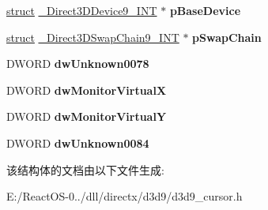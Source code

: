 \begin{DoxyCompactItemize}
\item 
\mbox{\label{struct___d3_d9_cursor_aa865b6a8f684fdb652df907484477e27}} 
\hyperlink{interfacestruct}{struct} \hyperlink{struct___direct3_d_device9___i_n_t}{\+\_\+\+Direct3\+D\+Device9\+\_\+\+I\+NT} $\ast$ {\bfseries p\+Base\+Device}
\item 
\mbox{\label{struct___d3_d9_cursor_ac754d85b96ef0510b540139c8926d7b4}} 
\hyperlink{interfacestruct}{struct} \hyperlink{struct___direct3_d_swap_chain9___i_n_t}{\+\_\+\+Direct3\+D\+Swap\+Chain9\+\_\+\+I\+NT} $\ast$ {\bfseries p\+Swap\+Chain}
\item 
\mbox{\label{struct___d3_d9_cursor_a02430f97c58c94e206a135e7b199d065}} 
D\+W\+O\+RD {\bfseries dw\+Unknown0078}
\item 
\mbox{\label{struct___d3_d9_cursor_a757d37cd7f889e6942c24077404c7244}} 
D\+W\+O\+RD {\bfseries dw\+Monitor\+VirtualX}
\item 
\mbox{\label{struct___d3_d9_cursor_a0c1f4914959c7ef550bbec9e30353316}} 
D\+W\+O\+RD {\bfseries dw\+Monitor\+VirtualY}
\item 
\mbox{\label{struct___d3_d9_cursor_a11416f4d5f58cd967e34e04666aec3c7}} 
D\+W\+O\+RD {\bfseries dw\+Unknown0084}
\end{DoxyCompactItemize}


该结构体的文档由以下文件生成\+:\begin{DoxyCompactItemize}
\item 
E\+:/\+React\+O\+S-\/0../dll/directx/d3d9/d3d9\+\_\+cursor.\+h\end{DoxyCompactItemize}
